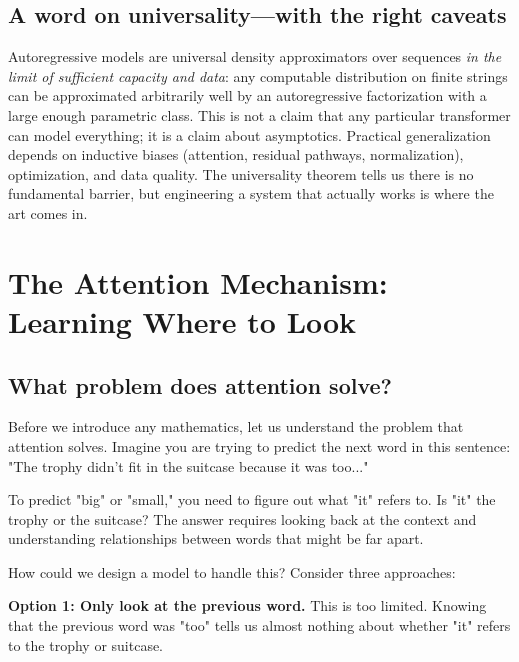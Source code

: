 \vspace{0.6em}

\subsection{A word on universality---with the right caveats}
\label{sec:universality}

Autoregressive models are universal density approximators over sequences \emph{in the limit of sufficient capacity and data}: any computable distribution on finite strings can be approximated arbitrarily well by an autoregressive factorization with a large enough parametric class. This is not a claim that any particular transformer can model everything; it is a claim about asymptotics. Practical generalization depends on inductive biases (attention, residual pathways, normalization), optimization, and data quality. The universality theorem tells us there is no fundamental barrier, but engineering a system that actually works is where the art comes in.

\vspace{1.2em}

\section{The Attention Mechanism: Learning Where to Look}
\label{sec:attention}

\subsection{What problem does attention solve?}
\label{sec:attention_motivation}

Before we introduce any mathematics, let us understand the problem that attention solves. Imagine you are trying to predict the next word in this sentence: "The trophy didn't fit in the suitcase because it was too..."

To predict "big" or "small," you need to figure out what "it" refers to. Is "it" the trophy or the suitcase? The answer requires looking back at the context and understanding relationships between words that might be far apart.

How could we design a model to handle this? Consider three approaches:

\textbf{Option 1: Only look at the previous word.} This is too limited. Knowing that the previous word was "too" tells us almost nothing about whether "it" refers to the trophy or suitcase.

